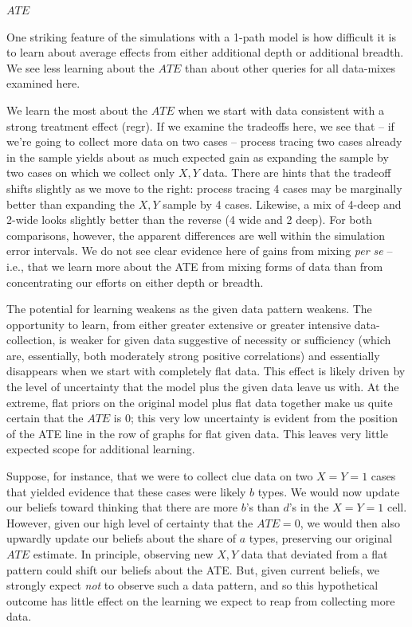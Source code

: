 \documentclass[
  12pt,
]{book}
\begin{document}
\textbf{\(ATE\)}

One striking feature of the simulations with a 1-path model is how difficult it is to learn about average effects from either additional depth or additional breadth. We see less learning about the \(ATE\) than about other queries for all data-mixes examined here.

We learn the most about the \(ATE\) when we start with data consistent with a strong treatment effect (regr). If we examine the tradeoffs here, we see that -- if we're going to collect more data on two cases -- process tracing two cases already in the sample yields about as much expected gain as expanding the sample by two cases on which we collect only \(X, Y\) data. There are hints that the tradeoff shifts slightly as we move to the right: process tracing 4 cases may be marginally better than expanding the \(X,Y\) sample by 4 cases. Likewise, a mix of 4-deep and 2-wide looks slightly better than the reverse (4 wide and 2 deep). For both comparisons, however, the apparent differences are well within the simulation error intervals. We do not see clear evidence here of gains from mixing \emph{per se} -- i.e., that we learn more about the ATE from mixing forms of data than from concentrating our efforts on either depth or breadth.

The potential for learning weakens as the given data pattern weakens. The opportunity to learn, from either greater extensive or greater intensive data-collection, is weaker for given data suggestive of necessity or sufficiency (which are, essentially, both moderately strong positive correlations) and essentially disappears when we start with completely flat data. This effect is likely driven by the level of uncertainty that the model plus the given data leave us with. At the extreme, flat priors on the original model plus flat data together make us quite certain that the \(ATE\) is 0; this very low uncertainty is evident from the position of the ATE line in the row of graphs for flat given data. This leaves very little expected scope for additional learning.

Suppose, for instance, that we were to collect clue data on two \(X=Y=1\) cases that yielded evidence that these cases were likely \(b\) types. We would now update our beliefs toward thinking that there are more \(b\)'s than \(d\)'s in the \(X=Y=1\) cell. However, given our high level of certainty that the \(ATE=0\), we would then also upwardly update our beliefs about the share of \(a\) types, preserving our original \(ATE\) estimate. In principle, observing new \(X,Y\) data that deviated from a flat pattern could shift our beliefs about the ATE. But, given current beliefs, we strongly expect \emph{not} to observe such a data pattern, and so this hypothetical outcome has little effect on the learning we expect to reap from collecting more data.
\end{document}
